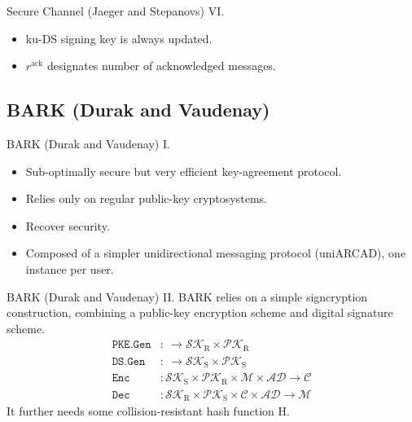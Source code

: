 \documentclass{beamer}
\renewcommand{\t}{\text}
\begin{document}
\begin{frame}{Secure Channel (Jaeger and Stepanovs) VI.}
  \scriptsize
  \begin{minipage}[h]{0.65\textwidth}
      \begin{figure}[ht]
        \centering
        \setlength{\fboxsep}{10pt}
        \scalebox{0.7}{%
        \fbox{%
          
        }
      }
    \end{figure}
    \end{minipage}
  \begin{minipage}[h]{0.34\textwidth}
      \begin{itemize}
      \item ku-DS signing key is always updated.
      \item $r^\t{ack}$ designates number of acknowledged messages.
      \end{itemize}
    \end{minipage}
\end{frame}

\subsection{BARK (Durak and Vaudenay)}
\label{sec:bark-durak-vaudenay}

\begin{frame}{BARK (Durak and Vaudenay) I.}
  \begin{itemize}
  \item Sub-optimally secure but very efficient key-agreement protocol.
  \item Relies only on regular public-key cryptosystems.
  \item Recover security.
  \item Composed of a simpler unidirectional messaging protocol (uniARCAD),
    one instance per user.
  \end{itemize}
\end{frame}

\begin{frame}{BARK (Durak and Vaudenay) II.}
  BARK relies on a simple signcryption construction, combining a public-key
  encryption scheme and digital signature scheme.
  \begin{align*}
    \texttt{PKE.Gen} & : \ \rightarrow \mathcal{SK}_\t{R} \times \mathcal{PK}_\t{R} \\
    \texttt{DS.Gen} & : \ \rightarrow \mathcal{SK}_\t{S} \times \mathcal{PK}_\t{S} \\
    \texttt{Enc} & : \mathcal{SK}_\t{S} \times \mathcal{PK}_\t{R} \times \mathcal{M} \times
                   \mathcal{AD} \rightarrow \mathcal{C} \\
    \texttt{Dec} & : \mathcal{SK}_\t{R} \times \mathcal{PK}_\t{S} \times
  \mathcal{C} \times \mathcal{AD} \rightarrow \mathcal{M}
  \end{align*}
  It further needs some collision-resistant hash function H.
\end{frame}
\end{document}
